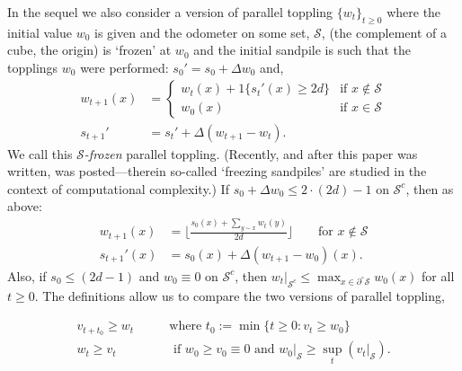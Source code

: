 \documentclass[aap]{imsart}
\begin{document}
In the sequel we also consider a version of parallel toppling $\{w_t\}_{t \geq 0}$ where 
the initial value $w_0$ is given and the odometer on some set, $\mathcal{S}$, (the complement of a cube, the origin) is `frozen' at $w_0$ 
and the initial sandpile is such that the topplings $w_0$ were performed: $s_0' = s_0 + \Delta w_0$ and, 
\begin{equation} \label{eq:frozen_parallel_toppling}
\begin{aligned}
w_{t+1}(x) &=
\begin{cases}
w_{t}(x) + 1 \{ s_{t}'(x) \geq 2 d \}  &\mbox{if $x \not \in \mathcal{S}$} \\
w_0(x)  &\mbox{if $x \in \mathcal{S}$}
\end{cases} \\
s_{t+1}' &= s_{t}' + \Delta (w_{t+1} - w_{t}).
\end{aligned} 
\end{equation}
We call this {\it $\mathcal{S}$-frozen} parallel toppling. (Recently, and after this paper was written, \cite{goles2021freezing} was posted---therein so-called `freezing sandpiles' are studied in the context of computational complexity.) 
If $s_0 + \Delta w_0 \leq 2 \cdot (2 d)-1$ on $\mathcal{S}^c$, then as above:
\begin{equation} \label{eq:frozen_parallel_toppling_recurse}
\begin{aligned}
w_{t+1}(x) &=   \lfloor \frac{ s_0(x) + \sum_{y \sim x} w_{t}(y)}{2 d} \rfloor  \qquad \mbox{for $x \not \in \mathcal{S}$} \\
s_{t+1}'(x) &= s_0(x) + \Delta (w_{t+1} - w_{0})(x).
\end{aligned}
\end{equation}
Also, if $s_0 \leq (2 d-1)$ and $w_0 \equiv 0$ on $\mathcal{S}^c$, then $w_t |_{\mathcal{S}^c} \leq \max_{x \in \partial^{\circ} \mathcal{S}} w_0(x)$ for all $t \geq 0$.
The definitions allow us to compare the two versions of parallel toppling,

\begin{equation} \label{eq:odometer_wave_comp}
\begin{aligned}
v_{t + t_0} \geq w_t  \qquad &\mbox{where $t_0:=  \min\{ t \geq 0 : v_{t} \geq w_0 \}$} \\
w_t \geq v_t  \qquad &\mbox{ if $w_0 \geq v_0 \equiv 0$ and $w_0|_{\mathcal{S}} \geq \sup_{t} (v_t|_{\mathcal{S}})$}.
\end{aligned}
\end{equation}
\end{document}
